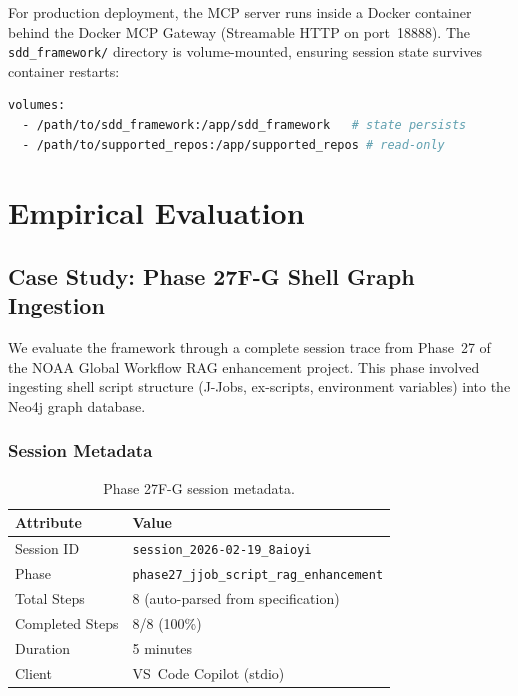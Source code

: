 \documentclass[11pt,letterpaper]{article}
\begin{document}
For production deployment, the MCP server runs inside a Docker container
behind the Docker MCP Gateway (Streamable HTTP on port~18888).  The
\texttt{sdd\_framework/} directory is volume-mounted, ensuring session
state survives container restarts:

\begin{lstlisting}[language=bash,caption={Volume mount for session persistence}]
volumes:
  - /path/to/sdd_framework:/app/sdd_framework   # state persists
  - /path/to/supported_repos:/app/supported_repos # read-only
\end{lstlisting}

\section{Empirical Evaluation}
\label{sec:evaluation}

\subsection{Case Study: Phase 27F-G Shell Graph Ingestion}

We evaluate the framework through a complete session trace from
Phase~27 of the NOAA Global Workflow RAG enhancement project.  This
phase involved ingesting shell script structure (J-Jobs, ex-scripts,
environment variables) into the Neo4j graph database.

\subsubsection{Session Metadata}

\begin{table}[h]
\centering
\caption{Phase 27F-G session metadata.}
\label{tab:session}
\begin{tabular}{@{}ll@{}}
\toprule
\textbf{Attribute} & \textbf{Value} \\
\midrule
Session ID        & \texttt{session\_2026-02-19\_8aioyi} \\
Phase             & \texttt{phase27\_jjob\_script\_rag\_enhancement} \\
Total Steps       & 8 (auto-parsed from specification) \\
Completed Steps   & 8/8 (100\%) \\
Duration          & 5 minutes \\
Client            & VS~Code Copilot (stdio) \\
\bottomrule
\end{tabular}
\end{table}
\end{document}
